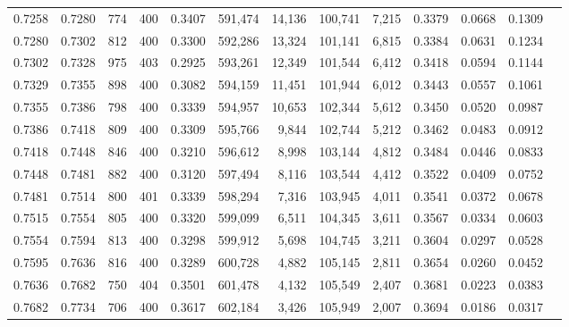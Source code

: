 \begin{tabular}{rrrrrrrrrrrrr}
0.7258 & 0.7280 &    774 & 400 &                                     0.3407 & 591,474 &  14,136 & 100,741 &   7,215 & 0.3379 & 0.0668 & 0.1309 \\
0.7280 & 0.7302 &    812 & 400 &                                     0.3300 & 592,286 &  13,324 & 101,141 &   6,815 & 0.3384 & 0.0631 & 0.1234 \\
0.7302 & 0.7328 &    975 & 403 &                                     0.2925 & 593,261 &  12,349 & 101,544 &   6,412 & 0.3418 & 0.0594 & 0.1144 \\
0.7329 & 0.7355 &    898 & 400 &                                     0.3082 & 594,159 &  11,451 & 101,944 &   6,012 & 0.3443 & 0.0557 & 0.1061 \\
0.7355 & 0.7386 &    798 & 400 &                                     0.3339 & 594,957 &  10,653 & 102,344 &   5,612 & 0.3450 & 0.0520 & 0.0987 \\
0.7386 & 0.7418 &    809 & 400 &                                     0.3309 & 595,766 &   9,844 & 102,744 &   5,212 & 0.3462 & 0.0483 & 0.0912 \\
0.7418 & 0.7448 &    846 & 400 &                                     0.3210 & 596,612 &   8,998 & 103,144 &   4,812 & 0.3484 & 0.0446 & 0.0833 \\
0.7448 & 0.7481 &    882 & 400 &                                     0.3120 & 597,494 &   8,116 & 103,544 &   4,412 & 0.3522 & 0.0409 & 0.0752 \\
0.7481 & 0.7514 &    800 & 401 &                                     0.3339 & 598,294 &   7,316 & 103,945 &   4,011 & 0.3541 & 0.0372 & 0.0678 \\
0.7515 & 0.7554 &    805 & 400 &                                     0.3320 & 599,099 &   6,511 & 104,345 &   3,611 & 0.3567 & 0.0334 & 0.0603 \\
0.7554 & 0.7594 &    813 & 400 &                                     0.3298 & 599,912 &   5,698 & 104,745 &   3,211 & 0.3604 & 0.0297 & 0.0528 \\
0.7595 & 0.7636 &    816 & 400 &                                     0.3289 & 600,728 &   4,882 & 105,145 &   2,811 & 0.3654 & 0.0260 & 0.0452 \\
0.7636 & 0.7682 &    750 & 404 &                                     0.3501 & 601,478 &   4,132 & 105,549 &   2,407 & 0.3681 & 0.0223 & 0.0383 \\
0.7682 & 0.7734 &    706 & 400 &                                     0.3617 & 602,184 &   3,426 & 105,949 &   2,007 & 0.3694 & 0.0186 & 0.0317 \\

\end{tabular}
